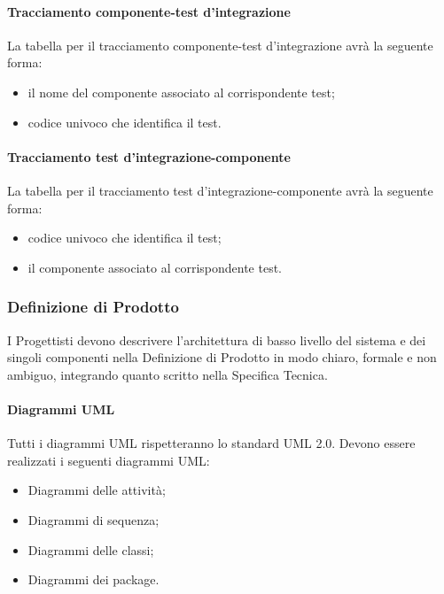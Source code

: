 \paragraph{Tracciamento componente-test d'integrazione}
La tabella per il tracciamento componente-test d'integrazione avrà la seguente forma:
\begin{itemize}
\item {} il nome del componente associato al corrispondente test;
\item {}codice univoco che identifica il test.
\end{itemize}

\paragraph{Tracciamento test d'integrazione-componente}
La tabella per il tracciamento test d'integrazione-componente avrà la seguente forma:
\begin{itemize}
\item {}codice univoco che identifica il test;
\item {} il componente associato al corrispondente test.
\end{itemize}

\subsubsection{Definizione di Prodotto}
\label{}
I Progettisti devono descrivere l'architettura di basso livello del sistema e dei singoli componenti nella Definizione di Prodotto in modo chiaro, formale e non ambiguo, integrando quanto scritto nella Specifica Tecnica.

\paragraph{Diagrammi UML}
\label{}
Tutti i diagrammi UML rispetteranno lo standard UML 2.0.
Devono essere realizzati i seguenti diagrammi UML:
\begin{itemize}
\item Diagrammi delle attività;
\item Diagrammi di sequenza;
\item Diagrammi delle classi;
\item Diagrammi dei package.
\end{itemize}

